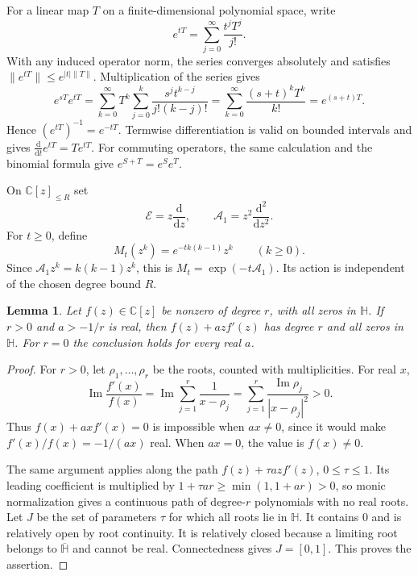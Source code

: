 \documentclass[reqno, 12pt]{article}
\numberwithin{equation}{section}
\newtheorem{lemma}[theorem]{Lemma}
\theoremstyle{definition}
\newcommand{\CC}{\mathbb C}
\begin{document}
For a linear map $T$ on a finite-dimensional polynomial space, write
\begin{equation}\label{st:matrix-exponential}
 e^{tT}=\sum_{j=0}^{\infty}\frac{t^jT^j}{j!}.
\end{equation}
With any induced operator norm, the series converges absolutely and
satisfies $\|e^{tT}\|\leq e^{|t|\|T\|}$.  Multiplication of the
series gives
\[
e^{sT}e^{tT}
=\sum_{k=0}^{\infty}T^k\sum_{j=0}^k
       \frac{s^j t^{k-j}}{j!(k-j)!}
=\sum_{k=0}^{\infty}\frac{(s+t)^kT^k}{k!}
=e^{(s+t)T}.
\]
Hence $(e^{tT})^{-1}=e^{-tT}$.  Termwise differentiation is valid
on bounded intervals and gives
$\frac{\mathrm d}{\mathrm dt}e^{tT}=Te^{tT}$.
For commuting operators, the same calculation and the binomial
formula give $e^{S+T}=e^Se^T$.

On $\CC[z]_{\leq R}$ set
\[
\mathcal E=z\frac{\mathrm d}{\mathrm dz},
\qquad
\mathcal A_1=z^2\frac{\mathrm d^2}{\mathrm dz^2}.
\]
For $t\geq0$, define
\begin{equation}\label{st:multiplier-definition}
M_t(z^k)=e^{-t k(k-1)}z^k\qquad(k\geq0).
\end{equation}
Since $\mathcal A_1z^k=k(k-1)z^k$, this is
$M_t=\exp(-t\mathcal A_1)$.  Its action is independent of the
chosen degree bound $R$.

\begin{lemma}\label{st:first-order}
Let $f(z)\in\CC[z]$ be nonzero of degree $r$, with all zeros in
$\mathbb H$.  If $r>0$ and $a>-1/r$ is real, then $f(z)+azf'(z)$
has degree $r$ and all zeros in $\mathbb H$.  For $r=0$ the
conclusion holds for every real $a$.
\end{lemma}
\begin{proof}
For $r>0$, let $\rho_1,\ldots,\rho_r$ be the roots, counted
with multiplicities.  For real $x$,
\begin{equation}\label{st:logarithmic-derivative}
\operatorname{Im}\frac{f'(x)}{f(x)}
=\operatorname{Im}\sum_{j=1}^r\frac1{x-\rho_j}
=\sum_{j=1}^r
\frac{\operatorname{Im}\rho_j}{|x-\rho_j|^2}>0.
\end{equation}
Thus $f(x)+axf'(x)=0$ is impossible when $ax\ne0$, since it
would make $f'(x)/f(x)=-1/(ax)$ real.  When $ax=0$, the value is
$f(x)\ne0$.

The same argument applies along the path $f(z)+\tau azf'(z)$, $0\leq\tau\leq1$.  Its leading coefficient is multiplied by
$1+\tau ar\geq\min(1,1+ar)>0$, so monic normalization gives
a continuous path of degree-$r$ polynomials with no real roots.
Let $J$ be the set of parameters $\tau$ for which all roots lie in
$\mathbb H$.  It contains $0$ and is relatively open by root
continuity.  It is relatively closed because a limiting root
belongs to $\overline{\mathbb H}$ and cannot be real.
Connectedness gives $J=[0,1]$. This proves the assertion.
\end{proof}
\end{document}
